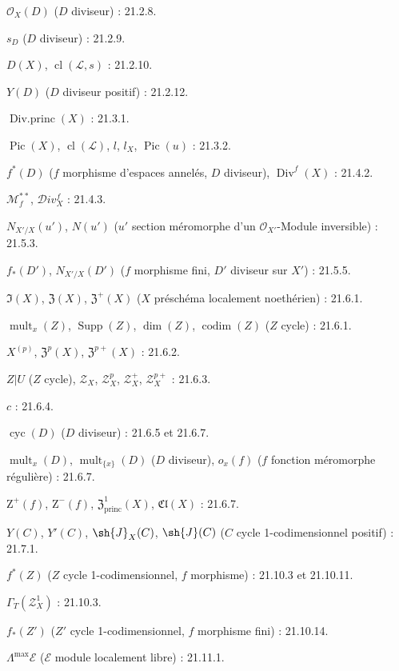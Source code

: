 $\mathcal O_X(D)$ ($D$ diviseur) : 21.2.8.

$s_D$ ($D$ diviseur) : 21.2.9.

$D(X)$, $\operatorname{cl}(\mathcal L,s)$ : 21.2.10.

$Y(D)$ ($D$ diviseur positif) : 21.2.12.

$\operatorname{Div.princ}(X)$ : 21.3.1.

$\operatorname{Pic}(X)$, $\operatorname{cl}(\mathcal L)$, $l$, $l_X$,
$\operatorname{Pic}(u)$ : 21.3.2.

$f^*(D)$ ($f$ morphisme d'espaces annelés, $D$ diviseur),
$\operatorname{Div}^f(X)$ : 21.4.2.

$\mathcal M_f^{**}$, $\mathcal{D}iv_X^f$ : 21.4.3.

$N_{X'/X}(u')$, $N(u')$
($u'$ section méromorphe d'un $\mathcal O_{X'}$-Module inversible) : 21.5.3.

$f_*(D')$, $N_{X'/X}(D')$
($f$ morphisme fini, $D'$ diviseur sur $X'$) : 21.5.5.

$\mathfrak I(X)$, $\mathfrak Z(X)$, $\mathfrak Z^+(X)$
($X$ préschéma localement noethérien) : 21.6.1.

$\operatorname{mult}_x(Z)$, $\operatorname{Supp}(Z)$,
$\dim(Z)$, $\operatorname{codim}(Z)$ ($Z$ cycle) : 21.6.1.

$X^{(p)}$, $\mathfrak Z^p(X)$, $\mathfrak Z^{p+}(X)$ : 21.6.2.

$Z|U$ ($Z$ cycle), $\mathscr Z_X$, $\mathscr Z_X^p$,
$\mathscr Z_X^+$, $\mathscr Z_X^{p+}$ : 21.6.3.

$c$ : 21.6.4.

$\operatorname{cyc}(D)$ ($D$ diviseur) : 21.6.5 et 21.6.7.

$\operatorname{mult}_x(D)$, $\operatorname{mult}_{\{x\}}(D)$
($D$ diviseur), $o_x(f)$ ($f$ fonction méromorphe régulière) : 21.6.7.

$\mathrm Z^+(f)$, $\mathrm Z^-(f)$, $\mathfrak Z^1_{\mathrm{princ}}(X)$,
$\mathfrak{Cl}(X)$ : 21.6.7.

$Y(C)$, $Y'(C)$, $\sh{J}_X(C)$, $\sh{J}(C)$
($C$ cycle 1-codimensionnel positif) : 21.7.1.

$f^*(Z)$ ($Z$ cycle 1-codimensionnel, $f$ morphisme) : 21.10.3 et 21.10.11.

$\Gamma_T(\mathscr Z_X^1)$ : 21.10.3.

$f_*(Z')$ ($Z'$ cycle 1-codimensionnel, $f$ morphisme fini) : 21.10.14.

$\Lambda^{\max}\mathcal E$ ($\mathcal E$ module localement libre) : 21.11.1.

